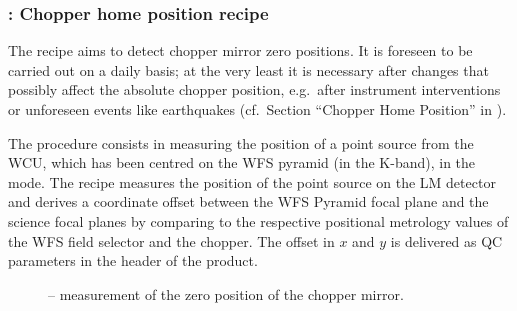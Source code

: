 \subsubsection{: Chopper home position recipe}
\label{sssec:metiscalchophome}
\label{sssec:metis_cal_chophome}
\label{metis_cal_chophome}
\label{rec:metiscalchophome}
\label{rec:metis_cal_chophome}

The recipe  aims to detect chopper mirror zero positions. It is foreseen to be carried out on a daily basis; at the very least it is necessary after changes that possibly affect the absolute chopper position, e.g.\ after instrument interventions or unforeseen events like earthquakes (cf.\ Section ``Chopper Home Position'' in  \cite{METIS-calibration_plan}).

The procedure consists in measuring the position of a point source
from the \ac{WCU}, which has been centred on the \ac{WFS} pyramid (in
the K-band), in the  mode.  The recipe measures the
position of the point source on the LM detector and derives a
coordinate offset between the \ac{WFS} Pyramid focal plane and the
science focal planes by comparing to the respective positional
metrology values of the \ac{WFS} field selector and the chopper.
The offset in $x$ and $y$ is delivered as QC parameters in the header
of the  product.




\begin{figure}[hb]
  \centering
  \def \globalscale {0.600000}
  \fontsize{10}{12}\selectfont
  
  \caption[Recipe: ]{ --
    measurement of the zero position of the chopper mirror.}
  \label{fig:metis_cal_chophome}
\end{figure}

\clearpage


